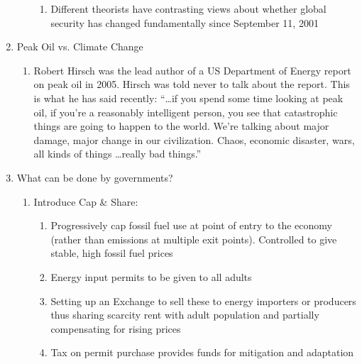 \documentclass[12pt]{article}
\begin{document}
\begin{enumerate}
\begin{enumerate}
\begin{enumerate}
              \item Different theorists have contrasting views about whether global security has changed fundamentally since September 11, 2001

            \end{enumerate}

        \end{enumerate}

      \item Peak Oil vs. Climate Change

        \begin{enumerate}

          \item Robert Hirsch was the lead author of a US Department of Energy report on peak oil in 2005. Hirsch was told never to talk about the report. This is what he has said recently: “\dots if you spend some time looking at peak oil, if you’re a reasonably intelligent person, you see that catastrophic things are going to happen to the world.  We’re talking about major damage, major change in our civilization. Chaos, economic disaster, wars, all kinds of things \dots really bad things.”

        \end{enumerate}

      \item What can be done by governments?

        \begin{enumerate}

          \item Introduce Cap \& Share:

            \begin{enumerate}

              \item Progressively cap fossil fuel use at point of entry to the economy (rather than  emissions at multiple exit points). Controlled to give stable, high fossil fuel prices  

              \item Energy input permits to be given to all adults

              \item Setting up an Exchange to sell these to energy importers or producers thus sharing scarcity rent with adult population and partially compensating for rising prices

              \item Tax on permit purchase provides funds for mitigation and adaptation


\end{enumerate}
\end{enumerate}
\end{enumerate}
\end{document}
